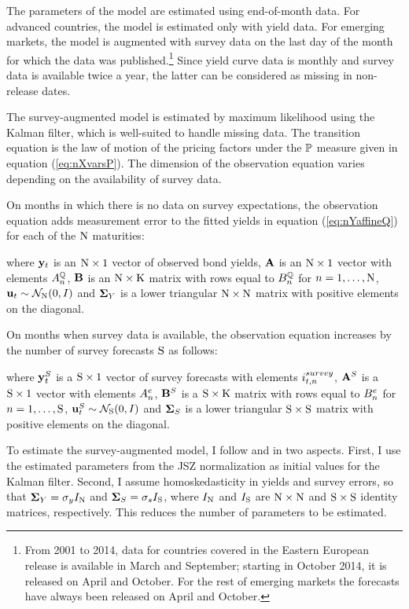 {The parameters of the model are estimated using end-of-month data.
For advanced countries, the model is estimated only with yield data.
For emerging markets, the model is augmented with survey data on the last day of the month for which the data was published.\footnote{ From 2001 to 2014, data for countries covered in the Eastern European release is available in March and September; starting in October 2014, it is released on April and October. For the rest of emerging markets the forecasts have always been released on April and October.}
Since yield curve data is monthly and survey data is available twice a year, the latter can be considered as missing in non-release dates.

The survey-augmented model is estimated by maximum likelihood using the Kalman filter, which is well-suited to handle missing data. 
The transition equation is the law of motion of the pricing factors under the \(\mathbb{P}\) measure given in equation (\ref{eq:nXvarsP}).
The dimension of the observation equation varies depending on the availability of survey data. 

On months in which there is no data on survey expectations, the observation equation adds measurement error to the fitted yields in equation (\ref{eq:nYaffineQ}) for each of the \(\mathrm{N}\) maturities:
	
\noindent where \(\mathbf{y}_{t}\) is an \(\mathrm{N} \times 1\) vector of observed bond yields, \(\mathbf{A}\) is an \(\mathrm{N} \times 1\) vector with elements \(A_{n}^{\mathbb{Q}}\), \(\mathbf{B}\) is an \(\mathrm{N} \times \mathrm{K}\) matrix with rows equal to \(B_{n}^{\mathbb{Q}}\) for \(n = 1, \ldots, \mathrm{N}\), \(\mathbf{u}_{t} \sim \mathcal{N}_{\mathrm{N}} (0,I) \) and \(\mathbf{\mathbf{\Sigma}}_{Y}\) is a lower triangular \(\mathrm{N} \times \mathrm{N}\) matrix with positive elements on the diagonal.

On months when survey data is available, the observation equation increases by the number of survey forecasts \(\mathrm{S}\) as follows:
	
\noindent where \(\mathbf{y}_{t}^{S}\) is a \(\mathrm{S} \times 1\) vector of survey forecasts with elements \(i_{t,n}^{survey}\), \(\mathbf{A}^{S}\) is a \(\mathrm{S} \times 1\) vector with elements \(A_{n}^{e}\), \(\mathbf{B}^{S}\) is a \(\mathrm{S} \times \mathrm{K}\) matrix with rows equal to \(B_{n}^{e}\) for \(n = 1, \ldots, \mathrm{S}\), \(\mathbf{u}_{t}^{S} \sim \mathcal{N}_{\mathrm{S}} (0,I) \) and \(\mathbf{\mathbf{\Sigma}}_{S}\) is a lower triangular \(\mathrm{S} \times \mathrm{S}\) matrix with positive elements on the diagonal.

To estimate the survey-augmented model, I follow \cite{Guimaraes:2014} and \cite{Lloyd:2018b} in two aspects. First, I use the estimated parameters from the JSZ normalization as initial values for the Kalman filter.
Second, I assume homoskedasticity in yields and survey errors, so that \(\mathbf{\mathbf{\Sigma}}_{Y} = \sigma_y I_{\mathrm{N}}\) and \(\mathbf{\mathbf{\Sigma}}_{S} = \sigma_s I_{\mathrm{S}}\), where \(I_{\mathrm{N}}\) and \(I_{\mathrm{S}}\) are \(\mathrm{N} \times \mathrm{N}\) and \(\mathrm{S} \times \mathrm{S}\) identity matrices, respectively.
This reduces the number of parameters to be estimated.

}
